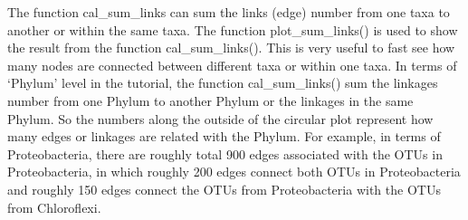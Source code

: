 \documentclass[
]{book}
\newenvironment{Shaded}{\begin{snugshade}}{\end{snugshade}}
\newcommand{\AttributeTok}[1]{\textcolor[rgb]{0.77,0.63,0.00}{#1}}
\newcommand{\CommentTok}[1]{\textcolor[rgb]{0.56,0.35,0.01}{\textit{#1}}}
\newcommand{\ConstantTok}[1]{\textcolor[rgb]{0.00,0.00,0.00}{#1}}
\newcommand{\DecValTok}[1]{\textcolor[rgb]{0.00,0.00,0.81}{#1}}
\newcommand{\FunctionTok}[1]{\textcolor[rgb]{0.00,0.00,0.00}{#1}}
\newcommand{\NormalTok}[1]{#1}
\newcommand{\OtherTok}[1]{\textcolor[rgb]{0.56,0.35,0.01}{#1}}
\newcommand{\SpecialCharTok}[1]{\textcolor[rgb]{0.00,0.00,0.00}{#1}}
\newcommand{\StringTok}[1]{\textcolor[rgb]{0.31,0.60,0.02}{#1}}
\begin{document}
\begin{Shaded}
\end{Shaded}

The function cal\_sum\_links can sum the links (edge) number from one taxa to another or within the same taxa.
The function plot\_sum\_links() is used to show the result from the function cal\_sum\_links().
This is very useful to fast see how many nodes are connected between different taxa or within one taxa.
In terms of `Phylum' level in the tutorial, the function cal\_sum\_links() sum the linkages number from one Phylum to another Phylum or the linkages in the same Phylum.
So the numbers along the outside of the circular plot represent how many edges or linkages are related with the Phylum.
For example, in terms of Proteobacteria, there are roughly total 900 edges associated with the OTUs in Proteobacteria,
in which roughly 200 edges connect both OTUs in Proteobacteria and roughly 150 edges connect the OTUs from Proteobacteria with the OTUs from Chloroflexi.
\end{document}
